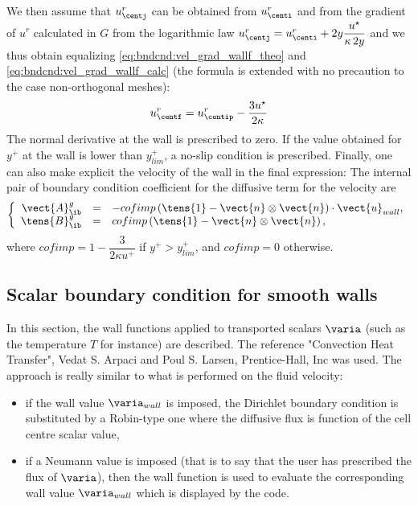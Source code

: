 We then assume that $u_{\centj}^r$ can be obtained from $u_{\centi}^r$
and from the gradient of $u^r$ calculated in $G$
from the logarithmic law 
$u_{\centj}^r = u_{\centi}^r +2y \displaystyle\dfrac{u^\star}{\kappa\, 2y}$ and we thus
obtain equalizing \eqref{eq:bndcnd:vel_grad_wallf_theo} and \eqref{eq:bndcnd:vel_grad_wallf_calc}
 (the formula is extended with no precaution to the case non-orthogonal meshes):  
%
\begin{equation}
u_{\centf}^r = u_{\centip}^r -  \dfrac{3 u^\star}{2\kappa }
\end{equation}
The normal derivative at the wall is prescribed to zero.
If the value obtained for $y^+$ at the wall is lower than $y^+_{lim}$, 
a no-slip condition is prescribed. Finally, one can also 
make explicit the velocity of the wall in the final expression:
%
The internal pair of boundary condition coefficient for the diffusive term for the velocity are 
\begin{equation}
\left\lbrace
\begin{array}{r c l}
\vect{A}^g_\ib & = & -cofimp \left(\tens{1} - \vect{n} \otimes \vect{n} \right) \cdot  \vect{u}_{wall}, \\
\tens{B}^g_\ib & = & cofimp \left(\tens{1} - \vect{n} \otimes \vect{n} \right) ,
\end{array}
\right.
\end{equation}
where $cofimp = 1 - \dfrac{3}{2 \kappa u^+}$ if $y^+ > y^+_{lim}$, and $cofimp = 0$ otherwise.

\subsection{Scalar boundary condition for smooth walls}

In this section, the wall functions applied to transported scalars $\varia$ (such as the temperature $T$ for instance) 
are described.
The reference "Convection Heat Transfer",
Vedat S. Arpaci and Poul S. Larsen, Prentice-Hall, Inc was used.
The approach is really similar to what is performed on the fluid velocity:
\begin{itemize}
\item if the wall value $\varia_{wall}$ is imposed, the Dirichlet boundary condition is
substituted by a Robin-type one where the diffusive flux is function of the cell centre scalar value, 
\item if a Neumann value is imposed (that is to say that the user has prescribed the flux of $\varia$), then the wall
function is used to evaluate the corresponding wall value $\varia_{wall}$ which is displayed by the code. 
\end{itemize}

